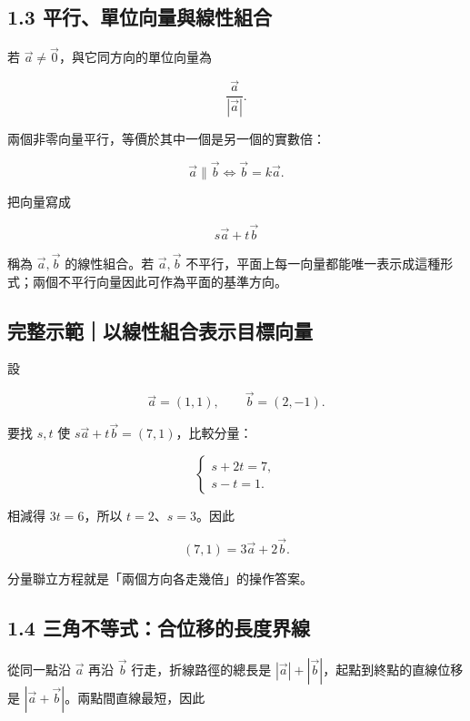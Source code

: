 \documentclass[11pt,a4paper]{article}
\begin{document}
\subsection{1.3 平行、單位向量與線性組合}\label{ux5e73ux884cux55aeux4f4dux5411ux91cfux8207ux7ddaux6027ux7d44ux5408}

若 \(\vec a\ne\vec0\)，與它同方向的單位向量為

\[
\boxed{\frac{\vec a}{|\vec a|}}.
\]

兩個非零向量平行，等價於其中一個是另一個的實數倍：

\[
\vec a\parallel\vec b
\iff
\vec b=k\vec a.
\]

把向量寫成

\[
s\vec a+t\vec b
\]

稱為 \(\vec a,\vec b\) 的線性組合。若 \(\vec a,\vec b\) 不平行，平面上每一向量都能唯一表示成這種形式；兩個不平行向量因此可作為平面的基準方向。

\begin{HandoutWorkedExample}

\subsection{完整示範｜以線性組合表示目標向量}\label{ux5b8cux6574ux793aux7bc4ux4ee5ux7ddaux6027ux7d44ux5408ux8868ux793aux76eeux6a19ux5411ux91cf}

設

\[
\vec a=(1,1),\qquad
\vec b=(2,-1).
\]

要找 \(s,t\) 使 \(s\vec a+t\vec b=(7,1)\)，比較分量：

\[
\begin{cases}
s+2t=7,\\
s-t=1.
\end{cases}
\]

相減得 \(3t=6\)，所以 \(t=2\)、\(s=3\)。因此

\[
(7,1)=3\vec a+2\vec b.
\]

分量聯立方程就是「兩個方向各走幾倍」的操作答案。

\end{HandoutWorkedExample}

\subsection{1.4 三角不等式：合位移的長度界線}\label{ux4e09ux89d2ux4e0dux7b49ux5f0fux5408ux4f4dux79fbux7684ux9577ux5ea6ux754cux7dda}

從同一點沿 \(\vec a\) 再沿 \(\vec b\) 行走，折線路徑的總長是 \(|\vec a|+|\vec b|\)，起點到終點的直線位移是 \(|\vec a+\vec b|\)。兩點間直線最短，因此
\end{document}
